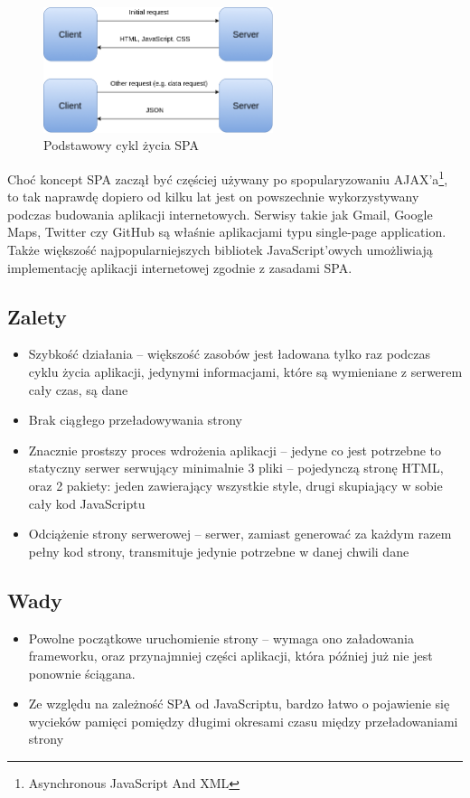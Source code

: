\begin{figure}[!h]
	\centering
	\includegraphics[width=0.6\textwidth]{images/spa}
	\caption{Podstawowy cykl życia SPA}
\end{figure}

Choć koncept SPA zaczął być częściej używany po spopularyzowaniu AJAX'a\footnote{Asynchronous JavaScript And XML}, to tak naprawdę dopiero od kilku lat jest on powszechnie wykorzystywany podczas budowania aplikacji internetowych. Serwisy takie jak Gmail, Google Maps, Twitter czy GitHub są właśnie aplikacjami typu single-page application. Także większość najpopularniejszych bibliotek JavaScript'owych umożliwiają implementację aplikacji internetowej zgodnie z zasadami SPA.
\subsection{Zalety}
\begin{itemize}
	\item Szybkość działania -- większość zasobów jest ładowana tylko raz podczas cyklu życia aplikacji, jedynymi informacjami, które są wymieniane z serwerem cały czas, są dane
	\item Brak ciągłego przeładowywania strony
	\item Znacznie prostszy proces wdrożenia aplikacji -- jedyne co jest potrzebne to statyczny serwer serwujący minimalnie 3 pliki -- pojedynczą stronę HTML, oraz 2 pakiety: jeden zawierający wszystkie style, drugi skupiający w sobie cały kod JavaScriptu
	\item Odciążenie strony serwerowej -- serwer, zamiast generować za każdym razem pełny kod strony, transmituje jedynie potrzebne w danej chwili dane
\end{itemize}
\subsection{Wady}
\begin{itemize}
	\item Powolne początkowe uruchomienie strony -- wymaga ono załadowania frameworku, oraz przynajmniej części aplikacji, która później już nie jest ponownie ściągana.
	\item Ze względu na zależność SPA od JavaScriptu, bardzo łatwo o pojawienie się wycieków pamięci pomiędzy długimi okresami czasu między przeładowaniami strony
\end{itemize}

